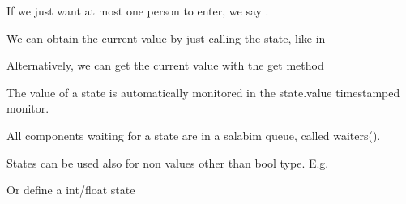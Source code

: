 \documentclass[letterpaper,10pt,english]{sphinxmanual}
\begin{document}
If we just want at most one person to enter, we say .

We can obtain the current value by just calling the state, like in

\begin{sphinxVerbatim}[commandchars=\\\{\}]
    
\end{sphinxVerbatim}

Alternatively, we can get the current value with the get method

\begin{sphinxVerbatim}[commandchars=\\\{\}]
    
\end{sphinxVerbatim}

The value of a state is automatically monitored in the state.value timestamped monitor.

All components waiting for a state are in a salabim queue, called waiters().

States can be used also for non values other than bool type. E.g.

\begin{sphinxVerbatim}[commandchars=\\\{\}]
 
\end{sphinxVerbatim}

Or define a int/float state

\begin{sphinxVerbatim}[commandchars=\\\{\}]
 
\end{sphinxVerbatim}
\end{document}
